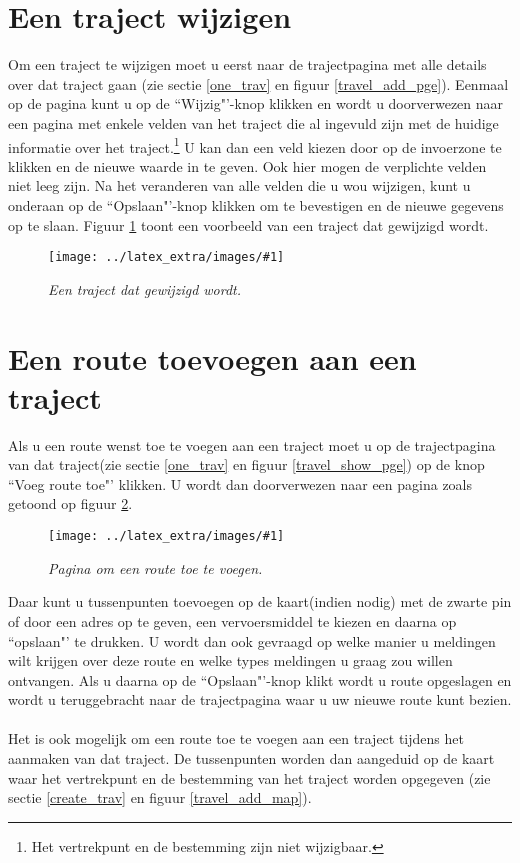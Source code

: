\documentclass[11pt,twoside,a4paper]{report}
\newcommand*{\copyimageH}[4]{ 			%
	\begin{figure}[Ht]
	\texttt{[image: ../latex\_extra/images/\#1]}
	\caption{\textit{#4}}\label{#2}
	\end{figure}
}
\begin{document}
		\section{Een traject wijzigen}\label{edit_trav}
Om een traject te wijzigen moet u eerst naar de trajectpagina met alle details over dat traject gaan (zie sectie \ref{one_trav} en figuur \ref{travel_add_pge}). Eenmaal op de pagina kunt u op de ``Wijzig"'-knop klikken en wordt u doorverwezen naar een pagina met enkele velden van het traject die al ingevuld zijn met de huidige informatie over het traject.\footnote{Het vertrekpunt en de bestemming zijn niet wijzigbaar.} U kan dan een veld kiezen door op de invoerzone te klikken en de nieuwe waarde in te geven. Ook hier mogen de verplichte velden \footnotemark[2] niet leeg zijn. Na het veranderen van alle velden die u wou wijzigen, kunt u onderaan op de ``Opslaan"'-knop klikken om te bevestigen en de nieuwe gegevens op te slaan. Figuur \ref{travel_edit_pge} toont een voorbeeld van een traject dat gewijzigd wordt.
\copyimageH{travel_edit.jpg}{travel_edit_pge}{\textwidth}{Een traject dat gewijzigd wordt.}

		\section{Een route toevoegen aan een traject}\label{create_route}
Als u een route wenst toe te voegen aan een traject moet u op de trajectpagina van dat traject(zie sectie \ref{one_trav} en figuur \ref{travel_show_pge}) op de knop ``Voeg route toe"' klikken. U wordt dan doorverwezen naar een pagina zoals getoond op figuur \ref{route_add_pge}.
\copyimageH{route_add.jpg}{route_add_pge}{\textwidth}{Pagina om een route toe te voegen.}
Daar kunt u tussenpunten toevoegen op de kaart(indien nodig) met de zwarte pin of door een adres op te geven, een vervoersmiddel te kiezen en daarna op ``opslaan"' te drukken. U wordt dan ook gevraagd op welke manier u meldingen wilt krijgen over deze route en welke types meldingen u graag zou willen ontvangen. Als u daarna op de ``Opslaan"'-knop klikt wordt u route opgeslagen en wordt u teruggebracht naar de trajectpagina waar u uw nieuwe route kunt bezien.
\paragraph{}Het is ook mogelijk om een route toe te voegen aan een traject tijdens het aanmaken van dat traject. De tussenpunten worden dan aangeduid op de kaart waar het vertrekpunt en de bestemming van het traject worden opgegeven (zie sectie \ref{create_trav} en figuur \ref{travel_add_map}).
\end{document}
